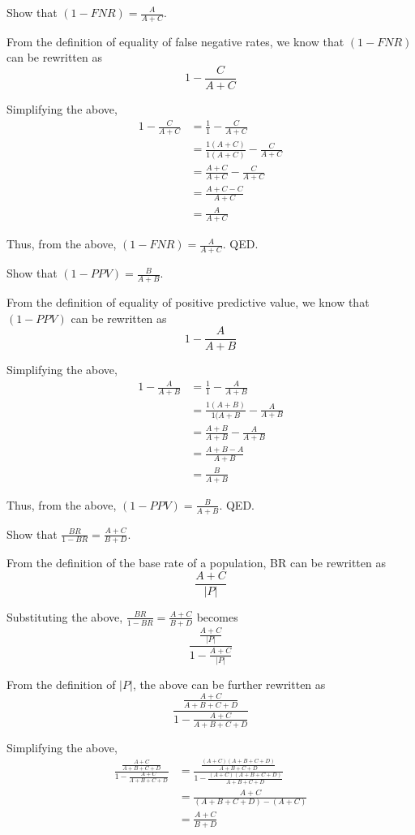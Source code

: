 \documentclass{cisXXX} %
\begin{document}
\maketitle
\HWproblem
Show that $(1-FNR) = \frac{A}{A+C}$.

From the definition of equality of false negative rates, we know that $(1-FNR)$ can be rewritten as 
$$1-\frac{C}{A+C}$$

Simplifying the above,
\begin{align*}
1-\frac{C}{A+C} &= \frac{1}{1} - \frac{C}{A+C}\\
&=\frac{1(A+C)}{1(A+C)} - \frac{C}{A+C}\\
&=\frac{A+C}{A+C} - \frac{C}{A+C}\\
&=\frac{A+C-C}{A+C}\\
&=\frac{A}{A+C}
\end{align*}

Thus, from the above, $(1-FNR) = \frac{A}{A+C}$. QED.

\HWproblem
Show that $(1-PPV) = \frac{B}{A+B}$.

From the definition of equality of positive predictive value, we know that $(1-PPV)$ can be rewritten as
$$1-\frac{A}{A+B}$$

Simplifying the above,
\begin{align*}
1-\frac{A}{A+B} &= \frac{1}{1} - \frac{A}{A+B}\\
&= \frac{1(A+B)}{1(A+B} - \frac{A}{A+B}\\
&= \frac{A+B}{A+B} - \frac{A}{A+B}\\
&= \frac{A+B - A}{A+B}\\
&= \frac{B}{A+B}
\end{align*}

Thus, from the above, $(1-PPV) = \frac{B}{A+B}$. QED.

\HWproblem
Show that $\frac{BR}{1-BR} = \frac{A+C}{B+D}$.

From the definition of the base rate of a population, BR can be rewritten as
$$\frac{A+C}{|P|}$$

Substituting the above, $\frac{BR}{1-BR} = \frac{A+C}{B+D}$ becomes
$$\frac{\frac{A+C}{|P|}}{1-\frac{A+C}{|P|}}$$

From the definition of $|P|$, the above can be further rewritten as
$$\frac{\frac{A+C}{A+B+C+D}}{1-\frac{A+C}{A+B+C+D}}$$

Simplifying the above,
\begin{align*}
\frac{\frac{A+C}{A+B+C+D}}{1-\frac{A+C}{A+B+C+D}} &= \frac{\frac{(A+C)(A+B+C+D)}{A+B+C+D}}{1-\frac{(A+C)(A+B+C+D)}{A+B+C+D}}\\
&= \frac{A+C}{(A+B+C+D) - (A+C)}\\
&= \frac{A+C}{B+D}
\end{align*}
\end{document}
